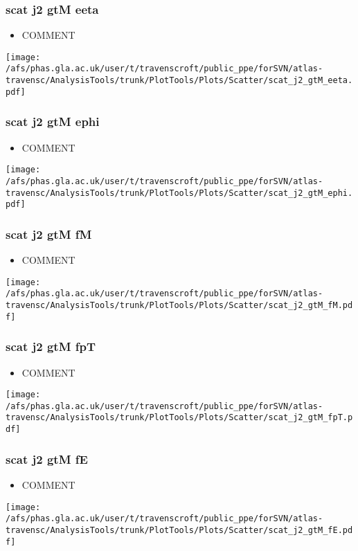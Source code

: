 \documentclass{beamer}
\begin{document}
\begin{frame}
\frametitle{scat j2 gtM eeta}
\begin{itemize}
\item COMMENT
\end{itemize}
\begin{center}
\texttt{[image: /afs/phas.gla.ac.uk/user/t/travenscroft/public\_ppe/forSVN/atlas-travensc/AnalysisTools/trunk/PlotTools/Plots/Scatter/scat\_j2\_gtM\_eeta.pdf]}
\end{center}
\end{frame}

\begin{frame}
\frametitle{scat j2 gtM ephi}
\begin{itemize}
\item COMMENT
\end{itemize}
\begin{center}
\texttt{[image: /afs/phas.gla.ac.uk/user/t/travenscroft/public\_ppe/forSVN/atlas-travensc/AnalysisTools/trunk/PlotTools/Plots/Scatter/scat\_j2\_gtM\_ephi.pdf]}
\end{center}
\end{frame}

\begin{frame}
\frametitle{scat j2 gtM fM}
\begin{itemize}
\item COMMENT
\end{itemize}
\begin{center}
\texttt{[image: /afs/phas.gla.ac.uk/user/t/travenscroft/public\_ppe/forSVN/atlas-travensc/AnalysisTools/trunk/PlotTools/Plots/Scatter/scat\_j2\_gtM\_fM.pdf]}
\end{center}
\end{frame}

\begin{frame}
\frametitle{scat j2 gtM fpT}
\begin{itemize}
\item COMMENT
\end{itemize}
\begin{center}
\texttt{[image: /afs/phas.gla.ac.uk/user/t/travenscroft/public\_ppe/forSVN/atlas-travensc/AnalysisTools/trunk/PlotTools/Plots/Scatter/scat\_j2\_gtM\_fpT.pdf]}
\end{center}
\end{frame}

\begin{frame}
\frametitle{scat j2 gtM fE}
\begin{itemize}
\item COMMENT
\end{itemize}
\begin{center}
\texttt{[image: /afs/phas.gla.ac.uk/user/t/travenscroft/public\_ppe/forSVN/atlas-travensc/AnalysisTools/trunk/PlotTools/Plots/Scatter/scat\_j2\_gtM\_fE.pdf]}
\end{center}
\end{frame}
\end{document}
